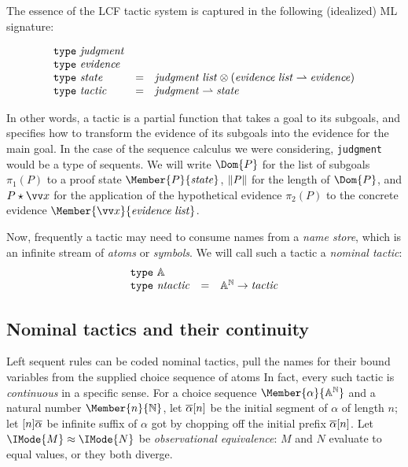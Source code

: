 The essence of the LCF tactic system is captured in the following (idealized)
ML signature:

\[
  \begin{array}{lcl}
    \mathtt{type}\ \mathit{judgment}\\
    \mathtt{type}\ \mathit{evidence}\\
    \mathtt{type}\ \mathit{state} &= &\mathit{judgment}\;\mathit{list} \otimes (\mathit{evidence}\;\mathit{list}\rightharpoonup \mathit{evidence})\\
    \mathtt{type}\ \mathit{tactic} &= &\mathit{judgment}\rightharpoonup \mathit{state}
  \end{array}
\]

In other words, a tactic is a partial function that takes a goal to its
subgoals, and specifies how to transform the evidence of its subgoals into the
evidence for the main goal. In the case of the sequence calculus we were
considering, \verb!judgment! would be a type of sequents. We will write
$\Dom{P}$ for the list of subgoals $\pi_1(P)$ to a proof state
$\Member{P}{\LCFState}$, $\lVert P\rVert$ for the length of $\Dom{P}$, and
$\LCFStateApply{P}{\vec{x}}$ for the application of the hypothetical evidence
$\pi_2(P)$ to the concrete evidence $\Member{\vec{x}}{\MLList{\LCFEvidence}}$.

Now, frequently a tactic may need to consume names from a \emph{name store},
which is an infinite stream of \emph{atoms} or \emph{symbols}. We will call
such a tactic a \emph{nominal tactic}:
\[
  \begin{array}{lcl}
    \mathtt{type}\ \mathbb{A}\\
    \mathtt{type}\ \mathit{ntactic} &= &{\mathbb{A}}^{\mathbb{N}} \to \mathit{tactic}
  \end{array}
\]

\newcommand\KleeneEq[2]{\IMode{#1}\approx \IMode{#2}}
\newcommand\ModC[1]{\mathsf{M}(#1)}

\subsection{Nominal tactics and their continuity}

Left sequent rules can be coded nominal tactics, pull the names for their bound
variables from the supplied choice sequence of atoms In fact, every such tactic
is \emph{continuous} in a specific sense. For a choice sequence
$\Member{\alpha}{\MLStream{\MLAtom}}$ and a natural number
$\Member{n}{\MLNat}$, let $\protect\overline{\alpha}[n]$ be the initial segment of
$\alpha$ of length $n$; let $[n]\protect\overline{\alpha}$ be infinite suffix of
$\alpha$ got by chopping off the initial prefix $\protect\overline{\alpha}[n]$. Let
$\KleeneEq{M}{N}$ be \emph{observational equivalence}: $M$ and $N$ evaluate to
equal values, or they both diverge.

